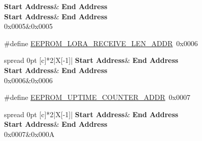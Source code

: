 \begin{DoxyCompactItemize}
\begin{DoxyCompactList}
\begin{longtabu}
\hline
\rowcolor{\tableheadbgcolor}\textbf{ Start Address}&\textbf{ End Address  }\\
\endfirsthead
\hline
\endfoot
\hline
\rowcolor{\tableheadbgcolor}\textbf{ Start Address}&\textbf{ End Address  }\\
\endhead
0x0005&0x0005 \\
\end{longtabu}
\end{DoxyCompactList}\item 
\mbox{\label{group__defines__eeprom__address__map_ga110fef28d82a0c77f7134cef20b16008}} 
\#define \hyperlink{group__defines__eeprom__address__map_ga110fef28d82a0c77f7134cef20b16008}{E\+E\+P\+R\+O\+M\+\_\+\+L\+O\+R\+A\+\_\+\+R\+E\+C\+E\+I\+V\+E\+\_\+\+L\+E\+N\+\_\+\+A\+D\+DR}~0x0006
\begin{DoxyCompactList}\small\item\em \tabulinesep=1mm
\begin{longtabu} spread 0pt [c]{*{2}{|X[-1]}|}
\hline
\rowcolor{\tableheadbgcolor}\textbf{ Start Address}&\textbf{ End Address  }\\
\endfirsthead
\hline
\endfoot
\hline
\rowcolor{\tableheadbgcolor}\textbf{ Start Address}&\textbf{ End Address  }\\
\endhead
0x0006&0x0006 \\
\end{longtabu}
\end{DoxyCompactList}\item 
\mbox{\label{group__defines__eeprom__address__map_ga8bd2bb8a04777f7fb9c24db8027e9a51}} 
\#define \hyperlink{group__defines__eeprom__address__map_ga8bd2bb8a04777f7fb9c24db8027e9a51}{E\+E\+P\+R\+O\+M\+\_\+\+U\+P\+T\+I\+M\+E\+\_\+\+C\+O\+U\+N\+T\+E\+R\+\_\+\+A\+D\+DR}~0x0007
\begin{DoxyCompactList}\small\item\em \tabulinesep=1mm
\begin{longtabu} spread 0pt [c]{*{2}{|X[-1]}|}
\hline
\rowcolor{\tableheadbgcolor}\textbf{ Start Address}&\textbf{ End Address  }\\
\endfirsthead
\hline
\endfoot
\hline
\rowcolor{\tableheadbgcolor}\textbf{ Start Address}&\textbf{ End Address  }\\
\endhead
0x0007&0x000A \\

\end{longtabu}
\end{DoxyCompactList}
\end{DoxyCompactItemize}
